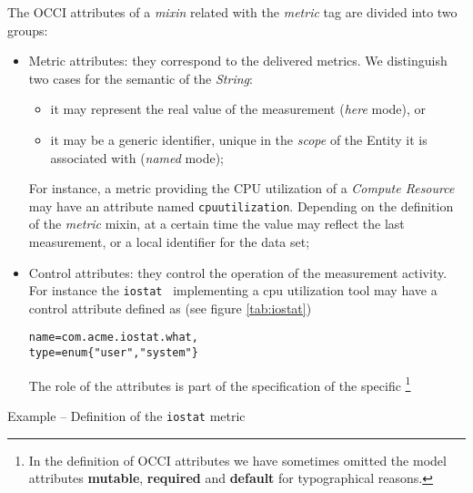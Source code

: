 \documentclass[10pt]{article}  %
\begin{document}
The OCCI attributes of a {\em mixin} related with the {\em metric} tag are divided into two groups:
\begin{itemize}

\item Metric attributes: they correspond to the delivered metrics. We distinguish two cases for the semantic of the {\em String}:
\begin{itemize}
\item it may represent the real value of the measurement ({\em here} mode), or
\item it may be a generic identifier, unique in the {\em scope} of the Entity it is associated with ({\em named} mode);
\end{itemize}
For instance, a metric providing the CPU utilization of a {\em Compute Resource} may have an attribute named {\tt \small cpuutilization}. Depending on the definition of the {\em metric} mixin, at a certain time the value may reflect the last measurement, or a local identifier for the data set;
\item Control attributes: they control the operation of the measurement activity. For instance the {\tt \small iostat} \mi\ implementing a cpu utilization tool may have a control attribute defined as (see figure \ref{tab:iostat}) 

\begin{verbatim}
name=com.acme.iostat.what,
type=enum{"user","system"}
\end{verbatim}

The role of the attributes is part of the specification of the specific \mi \footnote{In the definition of OCCI attributes we have sometimes omitted the model attributes {\bf mutable}, {\bf required} and {\bf default} for typographical reasons.}

\end{itemize}

\begin{table}
\caption{Example -- Definition of the {\tt \small iostat} metric \mi \label{tab:iostat} }  
\end{table}

\newcommand{\attrname}[1]{To enable interoperabilty, the provider SHOULD follow a defined standard for the naming of #1 attributes, but its specification falls outside the scope of this document. Such naming MAY help the discovery of {\em mixin} that are appropriate for a given task.}
\end{document}
